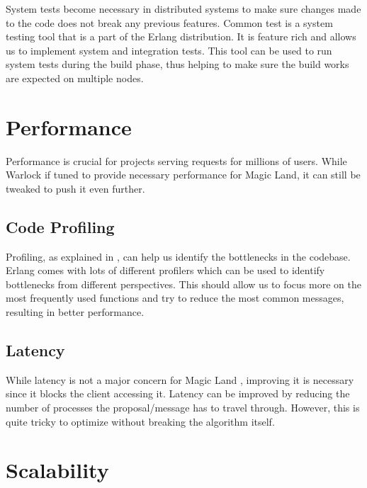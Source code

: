 System tests%
become necessary in distributed systems to make sure changes made to the code
does not break any previous features. Common test \citep{common.test} is a
system testing tool that is a part of the Erlang distribution. It is feature
rich and allows us to implement system and integration tests. This tool can
be used to run system tests during the build phase, thus helping to make sure
the build works are expected on multiple nodes.

\section{Performance}

Performance is crucial for projects serving requests for millions of users.
While Warlock if tuned to provide necessary performance for Magic Land, it
can still be tweaked to push it even further.

\subsection{Code Profiling}

Profiling, as explained in \citep{impl.profiling}, can help us identify the
bottlenecks in the codebase. Erlang comes with lots of different profilers
which can be used to identify bottlenecks from different perspectives. This
should allow us to focus more on the most frequently used functions and try
to reduce the most common messages, resulting in better performance.

\subsection{Latency}

While latency is not a major concern for Magic Land%
, improving it is necessary since it blocks the client accessing it. Latency
can be improved by reducing the number of processes the proposal/message has
to travel through. However, this is quite tricky to optimize without breaking
the algorithm itself.

\section{Scalability}

